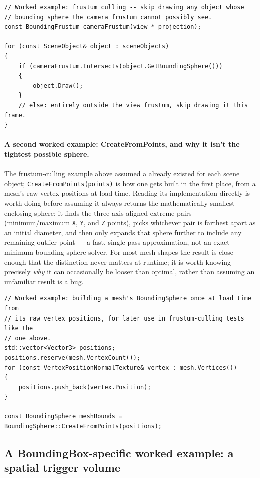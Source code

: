 \begin{lstlisting}
// Worked example: frustum culling -- skip drawing any object whose
// bounding sphere the camera frustum cannot possibly see.
const BoundingFrustum cameraFrustum(view * projection);

for (const SceneObject& object : sceneObjects)
{
    if (cameraFrustum.Intersects(object.GetBoundingSphere()))
    {
        object.Draw();
    }
    // else: entirely outside the view frustum, skip drawing it this frame.
}
\end{lstlisting}

\paragraph{A second worked example: CreateFromPoints, and why it isn't the tightest possible sphere.}
The frustum-culling example above assumed a  already existed for each
scene object; \texttt{CreateFromPoints(points)} is how one gets built in the first place, from
a mesh's raw vertex positions at load time. Reading its implementation directly is worth doing
before assuming it always returns the mathematically smallest enclosing sphere: it finds the
three axis-aligned extreme pairs (minimum/maximum \texttt{X}, \texttt{Y}, and \texttt{Z}
points), picks whichever pair is farthest apart as an initial diameter, and then only expands
that sphere further to include any remaining outlier point --- a fast, single-pass
approximation, not an exact minimum bounding sphere solver. For most mesh shapes the result is
close enough that the distinction never matters at runtime; it is worth knowing precisely
\emph{why} it can occasionally be looser than optimal, rather than assuming an unfamiliar
result is a bug.

\begin{lstlisting}
// Worked example: building a mesh's BoundingSphere once at load time from
// its raw vertex positions, for later use in frustum-culling tests like the
// one above.
std::vector<Vector3> positions;
positions.reserve(mesh.VertexCount());
for (const VertexPositionNormalTexture& vertex : mesh.Vertices())
{
    positions.push_back(vertex.Position);
}

const BoundingSphere meshBounds = BoundingSphere::CreateFromPoints(positions);
\end{lstlisting}

\subsection{A BoundingBox-specific worked example: a spatial trigger volume}

